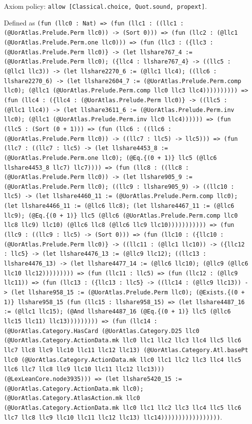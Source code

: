 \documentclass[11pt]{article}
\begin{document}
\noindent Axiom policy: \texttt{allow [Classical.choice, Quot.sound, propext]}.\par
\noindent Defined as \texttt{(fun (llc0 : Nat) => (fun (llc1 : ((llc1 : (@UorAtlas.Prelude.Perm llc0)) -> (Sort 0))) => (fun (llc2 : (@llc1 (@UorAtlas.Prelude.Perm.one llc0))) => (fun (llc3 : (\{llc3 : (@UorAtlas.Prelude.Perm llc0)\} -> (let llshare767\_4 := (@UorAtlas.Prelude.Perm llc0); (\{llc4 : llshare767\_4\} -> ((llc5 : (@llc1 llc3)) -> (let llshare2270\_6 := (@llc1 llc4); ((llc6 : llshare2270\_6) -> (let llshare2604\_7 := (@UorAtlas.Prelude.Perm.comp llc0); (@llc1 (@UorAtlas.Prelude.Perm.comp llc0 llc3 llc4)))))))))) => (fun (llc4 : (\{llc4 : (@UorAtlas.Prelude.Perm llc0)\} -> ((llc5 : (@llc1 llc4)) -> (let llshare3611\_6 := (@UorAtlas.Prelude.Perm.inv llc0); (@llc1 (@UorAtlas.Prelude.Perm.inv llc0 llc4)))))) => (fun (llc5 : (Sort (0 + 1))) => (fun (llc6 : ((llc6 : (@UorAtlas.Prelude.Perm llc0)) -> ((llc7 : llc5) -> llc5))) => (fun (llc7 : ((llc7 : llc5) -> (let llshare4453\_8 := (@UorAtlas.Prelude.Perm.one llc0); (@Eq.\{(0 + 1)\} llc5 (@llc6 llshare4453\_8 llc7) llc7)))) => (fun (llc8 : ((llc8 : (@UorAtlas.Prelude.Perm llc0)) -> (let llshare905\_9 := (@UorAtlas.Prelude.Perm llc0); ((llc9 : llshare905\_9) -> ((llc10 : llc5) -> (let llshare4460\_11 := (@UorAtlas.Prelude.Perm.comp llc0); (let llshare4466\_11 := (@llc6 llc8); (let llshare4467\_11 := (@llc6 llc9); (@Eq.\{(0 + 1)\} llc5 (@llc6 (@UorAtlas.Prelude.Perm.comp llc0 llc8 llc9) llc10) (@llc6 llc8 (@llc6 llc9 llc10))))))))))) => (fun (llc9 : ((llc9 : llc5) -> (Sort 0))) => (fun (llc10 : (\{llc10 : (@UorAtlas.Prelude.Perm llc0)\} -> ((llc11 : (@llc1 llc10)) -> (\{llc12 : llc5\} -> (let llshare4476\_13 := (@llc9 llc12); ((llc13 : llshare4476\_13) -> (let llshare4477\_14 := (@llc6 llc10); (@llc9 (@llc6 llc10 llc12))))))))) => (fun (llc11 : llc5) => (fun (llc12 : (@llc9 llc11)) => (fun (llc13 : (\{llc13 : llc5\} -> ((llc14 : (@llc9 llc13)) -> (let llshare958\_15 := (@UorAtlas.Prelude.Perm llc0); (@Exists.\{(0 + 1)\} llshare958\_15 (fun (llc15 : llshare958\_15) => (let llshare4487\_16 := (@llc1 llc15); (@And llshare4487\_16 (@Eq.\{(0 + 1)\} llc5 (@llc6 llc15 llc11) llc13))))))))) => (fun (llc14 : (@UorAtlas.Category.HasCard (@UorAtlas.Category.D25 llc0 (@UorAtlas.Category.ActionData.mk llc0 llc1 llc2 llc3 llc4 llc5 llc6 llc7 llc8 llc9 llc10 llc11 llc12 llc13) (@UorAtlas.Category.Atl.basePt llc0 (@UorAtlas.Category.ActionData.mk llc0 llc1 llc2 llc3 llc4 llc5 llc6 llc7 llc8 llc9 llc10 llc11 llc12 llc13))) (@LexLeanCore.node3935))) => (let llshare5420\_15 := (@UorAtlas.Category.ActionData.mk llc0); (@UorAtlas.Category.AtlasAction.mk llc0 (@UorAtlas.Category.ActionData.mk llc0 llc1 llc2 llc3 llc4 llc5 llc6 llc7 llc8 llc9 llc10 llc11 llc12 llc13) llc14)))))))))))))))))}.\par
\end{document}
